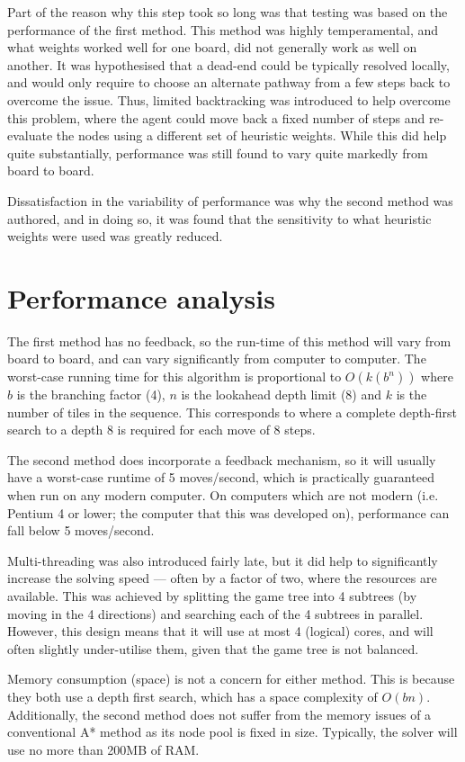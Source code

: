 \documentclass[a4paper, 11pt, titlepage]{report}
\begin{document}
Part of the reason why this step took so long was that testing was based on the performance of the first method. This method was highly temperamental, and what weights worked well for one board, did not generally work as well on another. It was hypothesised that a dead-end could be typically resolved locally, and would only require to choose an alternate pathway from a few steps back to overcome the issue. Thus, limited backtracking was introduced to help overcome this problem, where the agent could move back a fixed number of steps and re-evaluate the nodes using a different set of heuristic weights. While this did help quite substantially, performance was still found to vary quite markedly from board to board.

Dissatisfaction in the variability of performance was why the second method was authored, and in doing so, it was found that the sensitivity to what heuristic weights were used was greatly reduced.

\section{Performance analysis}
The first method has no feedback, so the run-time of this method will vary from board to board, and can vary significantly from computer to computer. The worst-case running time for this algorithm is proportional to $O(k(b^n))$ where $b$ is the branching factor (4), $n$ is the lookahead depth limit (8) and $k$ is the number of tiles in the sequence. This corresponds to where a complete depth-first search to a depth 8 is required for each move of 8 steps.

The second method does incorporate a feedback mechanism, so it will usually have a worst-case runtime of 5 moves/second, which is practically guaranteed when run on any modern computer. On computers which are not modern (i.e. Pentium 4 or lower; the computer that this was developed on), performance can fall below 5 moves/second.

Multi-threading was also introduced fairly late, but it did help to significantly increase the solving speed --- often by a factor of two, where the resources are available. This was achieved by splitting the game tree into 4 subtrees (by moving in the 4 directions) and searching each of the 4 subtrees in parallel. However, this design means that it will use at most 4 (logical) cores, and will often slightly under-utilise them, given that the game tree is not balanced.

Memory consumption (space) is not a concern for either method. This is because they both use a depth first search, which has a space complexity of $O(bn)$. Additionally, the second method does not suffer from the memory issues of a conventional A* method as its node pool is fixed in size. Typically, the solver will use no more than 200MB of RAM.
\end{document}
